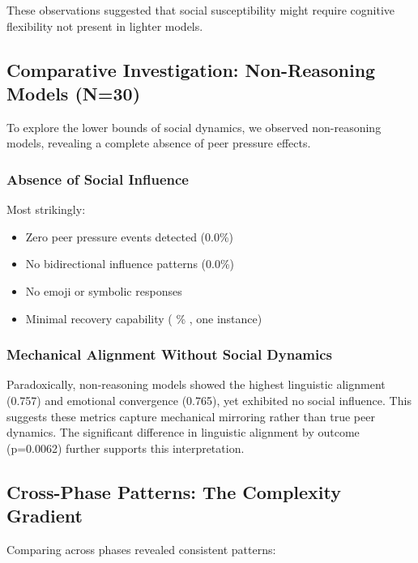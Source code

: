\documentclass[11pt,letterpaper]{article}
\newcommand{\expthreeTotalSessionsRaw}{30}
\newcommand{\expthreeRecoverySessionsRaw}{1}
\newcommand{\expthreeTotalSessions}{N=\expthreeTotalSessionsRaw}
\newcommand{\expthreeRecoveryPercentage}{%
  \fpeval{round(\expthreeRecoverySessionsRaw / \expthreeTotalSessionsRaw * 100, 1)}\%
}
\newcommand{\expthreePeerPressurePercentage}{0.0\%}
\newcommand{\expthreeBidirectionalPercentage}{0.0\%}
\newcommand{\expthreeAverageLinguisticAlignment}{0.757}
\newcommand{\expthreeAverageEmotionalConvergence}{0.765}
\newcommand{\expthreeLinguisticAlignmentPValue}{p=0.0062}
\begin{document}
These observations suggested that social susceptibility might require cognitive flexibility not present in lighter models.

\subsection{Comparative Investigation: Non-Reasoning Models (\expthreeTotalSessions{})}

To explore the lower bounds of social dynamics, we observed non-reasoning models, revealing a complete absence of peer pressure effects.

\subsubsection{Absence of Social Influence}

Most strikingly:
\begin{itemize}
    \item Zero peer pressure events detected (\expthreePeerPressurePercentage{})
    \item No bidirectional influence patterns (\expthreeBidirectionalPercentage{})
    \item No emoji or symbolic responses
    \item Minimal recovery capability (\expthreeRecoveryPercentage{}, one instance)
\end{itemize}

\subsubsection{Mechanical Alignment Without Social Dynamics}

Paradoxically, non-reasoning models showed the highest linguistic alignment (\expthreeAverageLinguisticAlignment{}) and emotional convergence (\expthreeAverageEmotionalConvergence{}), yet exhibited no social influence. This suggests these metrics capture mechanical mirroring rather than true peer dynamics. The significant difference in linguistic alignment by outcome (\expthreeLinguisticAlignmentPValue{}) further supports this interpretation.

\subsection{Cross-Phase Patterns: The Complexity Gradient}

Comparing across phases revealed consistent patterns:
\end{document}
